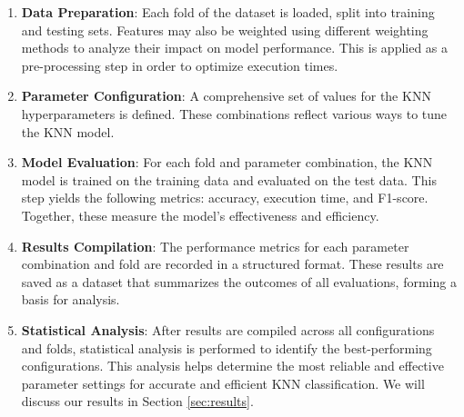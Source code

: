 \begin{enumerate}
    \item \textbf{Data Preparation}: Each fold of the dataset is loaded, split into training and testing sets. Features may also be weighted using different weighting methods to analyze their impact on model performance. This is applied as a pre-processing step in order to optimize execution times.

    \item \textbf{Parameter Configuration}: A comprehensive set of values for the KNN hyperparameters is defined. These combinations reflect various ways to tune the KNN model.

    \item \textbf{Model Evaluation}: For each fold and parameter combination, the KNN model is trained on the training data and evaluated on the test data. This step yields the following metrics: accuracy, execution time, and F1-score. Together, these measure the model’s effectiveness and efficiency.

    \item \textbf{Results Compilation}: The performance metrics for each parameter combination and fold are recorded in a structured format. These results are saved as a dataset that summarizes the outcomes of all evaluations, forming a basis for analysis.

    \item \textbf{Statistical Analysis}: After results are compiled across all configurations and folds, statistical analysis is performed to identify the best-performing configurations. This analysis helps determine the most reliable and effective parameter settings for accurate and efficient KNN classification. We will discuss our results in Section \ref{sec:results}.
\end{enumerate}
